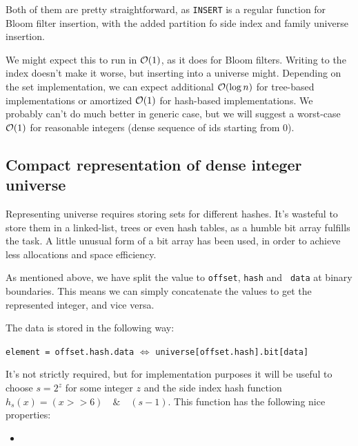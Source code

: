 Both of them are pretty straightforward, as {\tt INSERT} is a regular function
for Bloom filter insertion, with the added partition fo side index and family
universe insertion.

We might expect this to run in $\mathcal{O}(1)$, as it does for Bloom filters. Writing to
the index doesn't make it worse, but inserting into a universe might. Depending
on the set implementation, we can expect additional $\mathcal{O}(\log n)$ for tree-based
implementations or amortized $\mathcal{O}(1)$ for hash-based implementations. We probably
can't do much better in generic case, but we will suggest a worst-case $\mathcal{O}(1)$
for reasonable integers (dense sequence of ids starting from 0).


\subsection{Compact representation of dense integer universe}

Representing universe requires storing sets for different hashes. It's wasteful
to store them in a linked-list, trees or even hash tables, as a humble bit array
fulfills the task. A little unusual form of a bit array has been used, in order
to achieve less allocations and space efficiency.

As mentioned above, we have split the value to {\tt offset}, {\tt hash} and {\tt
data} at binary boundaries. This means we can simply concatenate the values to
get the represented integer, and vice versa.

The data is stored in the following way:

\begin{center}
	{\tt element = offset.hash.data} $\Leftrightarrow$
	{\tt universe[offset.hash].bit[data]}
\end{center}

It's not strictly required, but for implementation purposes it will be useful to
choose $s = 2^z$ for some integer $z$ and the side index hash function
\goodbreak $h_s(x) = (x >> 6)\quad\&\quad (s-1)$. This function has the
following nice properties:

\begin{itemize}
	\item  
\end{itemize}
